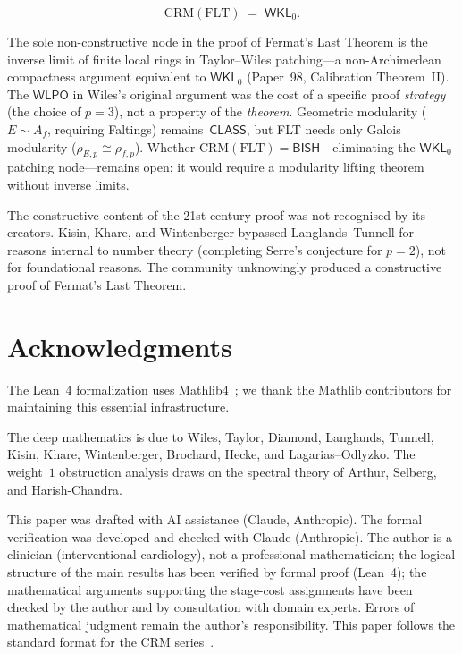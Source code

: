 \documentclass[11pt]{article}
\theoremstyle{plain}
\theoremstyle{definition}
\theoremstyle{remark}
\newcommand{\CRM}{\mathrm{CRM}}
\newcommand{\BISH}{\mathsf{BISH}}
\newcommand{\WLPO}{\mathsf{WLPO}}
\newcommand{\WKL}{\mathsf{WKL}_0}
\newcommand{\CLASS}{\mathsf{CLASS}}
\begin{document}
\[
  \boxed{\CRM(\mathrm{FLT}) \;=\; \WKL.}
\]

The sole non-constructive node in the proof of Fermat's Last
Theorem is the inverse limit of finite local rings in
Taylor--Wiles patching---a non-Archimedean compactness argument
equivalent to $\WKL$ (Paper~98, Calibration Theorem~II).
The $\WLPO$ in Wiles's original argument was the cost of a
specific proof \emph{strategy} (the choice of $p = 3$), not a
property of the \emph{theorem}.  Geometric modularity
($E \sim A_f$, requiring Faltings) remains~$\CLASS$, but FLT
needs only Galois modularity ($\rho_{E,p} \cong \rho_{f,p}$).
Whether $\CRM(\mathrm{FLT}) = \BISH$---eliminating the $\WKL$
patching node---remains open; it would require a modularity
lifting theorem without inverse limits.

The constructive content of the 21st-century proof was not
recognised by its creators.  Kisin, Khare, and Wintenberger
bypassed Langlands--Tunnell for reasons internal to number
theory (completing Serre's conjecture for $p = 2$), not for
foundational reasons.  The community unknowingly produced a
constructive proof of Fermat's Last Theorem.


\section*{Acknowledgments}

The Lean~4 formalization uses Mathlib4~\cite{mathlib}; we thank the
Mathlib contributors for maintaining this essential infrastructure.

The deep mathematics is due to Wiles, Taylor, Diamond,
Langlands, Tunnell, Kisin, Khare, Wintenberger, Brochard,
Hecke, and Lagarias--Odlyzko.  The weight~$1$ obstruction
analysis draws on the spectral theory of Arthur, Selberg,
and Harish-Chandra.

This paper was drafted with AI assistance (Claude, Anthropic).
The formal verification was developed and checked with Claude
(Anthropic).  The author is a clinician (interventional
cardiology), not a professional mathematician; the logical structure
of the main results has been verified by formal proof (Lean~4); the
mathematical arguments supporting the stage-cost assignments have been
checked by the author and by consultation with domain experts.
Errors of mathematical judgment remain the author's responsibility.
This paper follows the standard format for the CRM
series~\cite{format-guide}.
\end{document}
